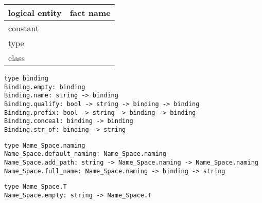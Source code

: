 \begin{isabellebody}
\begin{isamarkuptext}
  \medskip
  \begin{tabular}{ll}
  logical entity & fact name \\\hline
  constant \isa{c} & \isa{c{\isaliteral{2E}{\isachardot}}intro} \\
  type \isa{c} & \isa{c{\isaliteral{5F}{\isacharunderscore}}type{\isaliteral{2E}{\isachardot}}intro} \\
  class \isa{c} & \isa{c{\isaliteral{5F}{\isacharunderscore}}class{\isaliteral{2E}{\isachardot}}intro} \\
  \end{tabular}%
\end{isamarkuptext}%
\isamarkuptrue%
%
\isadelimmlref
%
\endisadelimmlref
%
\isatagmlref
%
\begin{isamarkuptext}%
\begin{mldecls}
  \verb|type binding| \\
  \verb|Binding.empty: binding| \\
  \verb|Binding.name: string -> binding| \\
  \verb|Binding.qualify: bool -> string -> binding -> binding| \\
  \verb|Binding.prefix: bool -> string -> binding -> binding| \\
  \verb|Binding.conceal: binding -> binding| \\
  \verb|Binding.str_of: binding -> string| \\
  \end{mldecls}
  \begin{mldecls}
  \verb|type Name_Space.naming| \\
  \verb|Name_Space.default_naming: Name_Space.naming| \\
  \verb|Name_Space.add_path: string -> Name_Space.naming -> Name_Space.naming| \\
  \verb|Name_Space.full_name: Name_Space.naming -> binding -> string| \\
  \end{mldecls}
  \begin{mldecls}
  \verb|type Name_Space.T| \\
  \verb|Name_Space.empty: string -> Name_Space.T| \\

\end{mldecls}
\end{isamarkuptext}
\end{isabellebody}
